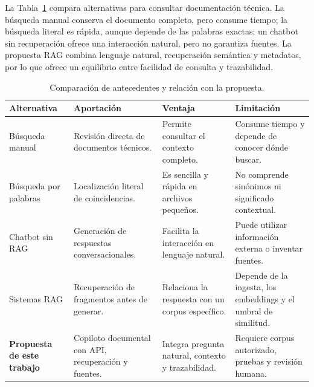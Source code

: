 La Tabla~\ref{tab:comparativa_antecedentes} compara alternativas para consultar documentación técnica. La búsqueda manual conserva el documento completo, pero consume tiempo; la búsqueda literal es rápida, aunque depende de las palabras exactas; un chatbot sin recuperación ofrece una interacción natural, pero no garantiza fuentes. La propuesta RAG combina lenguaje natural, recuperación semántica y metadatos, por lo que ofrece un equilibrio entre facilidad de consulta y trazabilidad.

\begin{table}[H]
\centering
\caption{Comparación de antecedentes y relación con la propuesta.}
\label{tab:comparativa_antecedentes}
\small
\begin{tabular}{@{}p{3.1cm}p{3.6cm}p{3.6cm}p{3.5cm}@{}}
\toprule
\textbf{Alternativa} & \textbf{Aportación} & \textbf{Ventaja} & \textbf{Limitación} \\
\midrule
Búsqueda manual & Revisión directa de documentos técnicos. & Permite consultar el contexto completo. & Consume tiempo y depende de conocer dónde buscar. \\
Búsqueda por palabras & Localización literal de coincidencias. & Es sencilla y rápida en archivos pequeños. & No comprende sinónimos ni significado contextual. \\
Chatbot sin RAG & Generación de respuestas conversacionales. & Facilita la interacción en lenguaje natural. & Puede utilizar información externa o inventar fuentes. \\
Sistemas RAG \cite{lewis2020rag,gao2023rag} & Recuperación de fragmentos antes de generar. & Relaciona la respuesta con un corpus específico. & Depende de la ingesta, los embeddings y el umbral de similitud. \\
\textbf{Propuesta de este trabajo} & Copiloto documental con API, recuperación y fuentes. & Integra pregunta natural, contexto y trazabilidad. & Requiere corpus autorizado, pruebas y revisión humana. \\
\bottomrule
\end{tabular}
\end{table}
